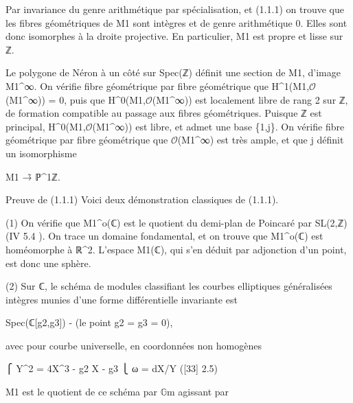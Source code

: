 \documentclass[11pt,a4paper]{article}
\begin{document}
Par invariance du genre arithmétique par spécialisation, et (1.1.1) on trouve que les fibres géométriques de M\textunderscore{}1 sont intègres et de genre arithmétique 0. Elles sont donc isomorphes à la droite projective. En particulier, M\textunderscore{}1 est propre et lisse sur ℤ.

Le polygone de Néron à un côté sur Spec(ℤ) définit une section de M\textunderscore{}1, d'image M\textunderscore{}1\textasciicircum{}∞. On vérifie fibre géométrique par fibre géométrique que H\textasciicircum{}1(M\textunderscore{}1,\ensuremath{\mathcal{O}}(M\textunderscore{}1\textasciicircum{}∞)) = 0, puis que H\textasciicircum{}0(M\textunderscore{}1,\ensuremath{\mathcal{O}}(M\textunderscore{}1\textasciicircum{}∞)) est localement libre de rang 2 sur ℤ, de formation compatible au passage aux fibres géométriques. Puisque ℤ est principal, H\textasciicircum{}0(M\textunderscore{}1,\ensuremath{\mathcal{O}}(M\textunderscore{}1\textasciicircum{}∞)) est libre, et admet une base \{1,j\}. On vérifie fibre géométrique par fibre géométrique que \ensuremath{\mathcal{O}}(M\textunderscore{}1\textasciicircum{}∞) est très ample, et que j définit un isomorphisme

M\textunderscore{}1 →̃ ℙ\textasciicircum{}1\textunderscore{}ℤ.

Preuve de (1.1.1) Voici deux démonstration classiques de (1.1.1).

(1) On vérifie que M\textunderscore{}1\textasciicircum{}o(ℂ) est le quotient du demi-plan de Poincaré par SL(2,ℤ) (IV 5.4   ). On trace un domaine fondamental, et on trouve que M\textunderscore{}1\textasciicircum{}o(ℂ) est homéomorphe à ℝ\textasciicircum{}2. L'espace M\textunderscore{}1(ℂ), qui s'en déduit par adjonction d'un point, est donc une sphère.

(2) Sur ℂ, le schéma de modules classifiant les courbes elliptiques généralisées intègres munies d'une forme différentielle invariante est

Spec(ℂ[g\textunderscore{}2,g\textunderscore{}3]) - (le point g\textunderscore{}2 = g\textunderscore{}3 = 0),

avec pour courbe universelle, en coordonnées non homogènes

⎧ Y\textasciicircum{}2 = 4X\textasciicircum{}3 - g\textunderscore{}2 X - g\textunderscore{}3 ⎩ ω = dX/Y                                      ([33] 2.5)

M\textunderscore{}1 est le quotient de ce schéma par \ensuremath{\mathbb{G}}\textunderscore{}m agissant par
\end{document}
